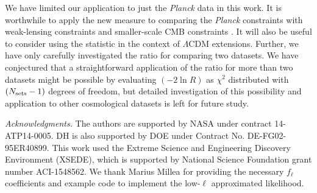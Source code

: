 \documentclass[amsmath, amssymb, reprint, aps]{revtex4-1}
\begin{document}
{    We have limited our application to just the {\it Planck} data in this work. It is worthwhile to apply the new measure to comparing the {\it Planck} constraints with weak-lensing constraints \cite{Abbott:2017wau} and smaller-scale CMB constraints \cite{Aylor:2017haa}. It will also be useful to consider using the statistic in the context of $\Lambda$CDM extensions. Further, we have only carefully investigated the ratio for comparing two datasets. We have conjectured that a straightforward application of the ratio for more than two datasets might be possible by evaluating $(-2\ln R)$ as $\chi^2$ distributed with $(N_{\rm sets}-1)$ degrees of freedom, but detailed investigation of this possibility and application to other cosmological datasets is left for future study.
        
    \medskip
    \textit{Acknowledgments.}
    The authors are supported by NASA under contract 14-ATP14-0005. DH is also supported by DOE under
    Contract No. DE-FG02-95ER40899. This work used the Extreme Science and Engineering Discovery Environment (XSEDE), which is supported by National Science Foundation grant number ACI-1548562. We thank Marius Millea for providing the necessary $f_\ell$ coefficients and example code to implement the low-$\ell$ approximated likelihood.
        
}
\end{document}

